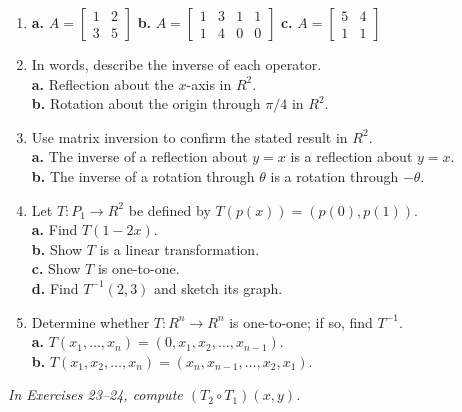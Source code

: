 \documentclass{article}
\begin{document}
\begin{enumerate}
  \item[13.] \textbf{a.} $A = \begin{bmatrix}1&2\\3&5\end{bmatrix}$
        \quad \textbf{b.} $A = \begin{bmatrix}1&3&1&1\\1&4&0&0\end{bmatrix}$
        \quad \textbf{c.} $A = \begin{bmatrix}5&4\\1&1\end{bmatrix}$

  \item[15.] In words, describe the inverse of each operator.\\
        \textbf{a.} Reflection about the $x$-axis in $R^2$.\\
        \textbf{b.} Rotation about the origin through $\pi/4$ in $R^2$.

  \item[17.] Use matrix inversion to confirm the stated result in $R^2$.\\
        \textbf{a.} The inverse of a reflection about $y=x$ is a reflection about $y=x$.\\
        \textbf{b.} The inverse of a rotation through $\theta$ is a rotation through $-\theta$.

  \item[19.] Let $T : P_1 \to R^2$ be defined by $T(p(x)) = (p(0), p(1))$.\\
        \textbf{a.} Find $T(1-2x)$.\\
        \textbf{b.} Show $T$ is a linear transformation.\\
        \textbf{c.} Show $T$ is one-to-one.\\
        \textbf{d.} Find $T^{-1}(2,3)$ and sketch its graph.

  \item[20.] Determine whether $T : R^n \to R^n$ is one-to-one; if so, find $T^{-1}$.\\
        \textbf{a.} $T(x_1,\ldots,x_n) = (0,x_1,x_2,\ldots,x_{n-1})$.\\
        \textbf{b.} $T(x_1,x_2,\ldots,x_n) = (x_n,x_{n-1},\ldots,x_2,x_1)$.

\end{enumerate}

\noindent\textit{In Exercises 23--24, compute $(T_2 \circ T_1)(x,y)$.}
\end{document}

